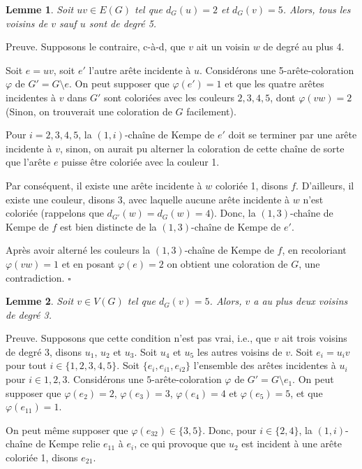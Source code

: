 \documentclass[10pt,a4paper]{article}
\newtheorem{lemme}{Lemme}
\newcommand{\ep}{{\hfill $\square$}}
\begin{document}
\begin{lemme}
Soit $uv \in E(G)$ tel que $d_G(u) = 2$ et $d_G(v) = 5$. Alors, tous les voisins de $v$ sauf $u$ sont de degré 5. 
\label{le:254}
\end{lemme}

Preuve. 
Supposons le contraire, c-à-d, que $v$ ait un voisin $w$ de degré au plus 4.

Soit $e=uv$, soit $e'$ l'autre arête incidente à $u$.
Considérons une 5-arête-coloration $\varphi$ de $G'=G \setminus e$. On peut supposer que $\varphi(e')=1$ et que les quatre arêtes incidentes à $v$ dans $G'$ sont coloriées avec les couleurs $2,3,4,5$, dont $\varphi(vw)=2$ (Sinon, on trouverait une coloration de $G$ facilement).

Pour $i=2,3,4,5$, la $(1,i)$-chaîne de Kempe de $e'$ doit se terminer par une arête incidente à $v$, sinon, on aurait pu alterner la coloration de cette chaîne de sorte que l'arête $e$ puisse être coloriée avec la couleur 1. 

Par conséquent, il existe une arête incidente à $w$ coloriée 1, disons $f$. D'ailleurs, il existe une couleur, disons 3, avec laquelle aucune arête incidente à $w$ n'est coloriée (rappelons que $d_{G'}(w)=d_G(w)=4$). Donc, la $(1,3)$-chaîne de Kempe de $f$ est bien distincte de la $(1,3)$-chaîne de Kempe de $e'$.

Après avoir alterné les couleurs la $(1,3)$-chaîne de Kempe de $f$, en recoloriant $\varphi(vw)=1$ et en posant $\varphi(e)=2$ on obtient une coloration de $G$, une contradiction. \ep

\begin{lemme}
Soit $v \in V(G)$ tel que $d_G(v) = 5$. Alors, $v$ a au plus deux voisins de degré 3.
\label{le:5333}
\end{lemme}


Preuve.
Supposons que cette condition n'est pas vrai, i.e., que $v$ ait trois voisins de degré 3, disons $u_1$, $u_2$ et $u_3$. Soit $u_4$ et $u_5$ les autres voisins de $v$. Soit $e_i = u_iv$ pour tout $i \in \{1,2,3,4,5\}$. Soit $\{e_i, e_{i1}, e_{i2}\}$ l'ensemble des arêtes incidentes à $u_i$ pour $i \in {1,2,3}$. Considérons une $5$-arête-coloration $\varphi$ de $G' = G \setminus e_1$. On peut supposer que $\varphi(e_2)=2$, $\varphi(e_3)=3$, $\varphi(e_4)=4$ et $\varphi(e_5)=5$, et que $\varphi(e_{11}) = 1$. 

On peut même supposer que $\varphi(e_{32}) \in \{3,5\}$.
Donc, pour $i \in \{2,4\}$, la $(1,i)$-chaîne de Kempe relie $e_{11}$ à $e_i$, ce qui provoque que $u_2$ est incident à une arête coloriée 1, disons $e_{21}$. 
\end{document}
